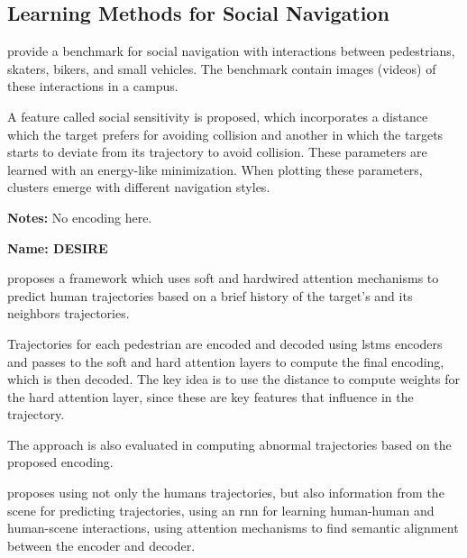 \subsection{Learning Methods for Social Navigation}\label{subsec: learning social navigation}


\cite{robicquet2016learning} provide a benchmark for social navigation with interactions between pedestrians, skaters, bikers, and small vehicles. 
%
The benchmark contain images (videos) of these interactions in a campus.

A feature called social sensitivity is proposed, which incorporates a distance which the target prefers for avoiding collision and another in which the targets starts to deviate from its trajectory to avoid collision.
%
These parameters are learned with an energy-like minimization.
%
When plotting these parameters, clusters emerge with different navigation styles.

\textbf{Notes:} No encoding here. 


\textbf{Name: DESIRE}

\cite{lee2017desire}


\cite{fernando2018soft+} proposes a framework which uses soft and hardwired attention mechanisms to predict human trajectories based on a brief history of the target's and its neighbors trajectories.

Trajectories for each pedestrian are encoded and decoded using \glspl{lstm} encoders and passes to the soft and hard attention layers to compute the final encoding, which is then decoded.
%
The key idea is to use the distance to compute weights for the hard attention layer, since these are key features that influence in the trajectory.

The approach is also evaluated in computing abnormal trajectories based on the proposed encoding.


\cite{bhujel2019pedestrian} proposes using not only the humans trajectories, but also information from the scene for predicting trajectories, using an \gls{rnn} for learning human-human and human-scene interactions, using attention mechanisms to find semantic alignment between the encoder and decoder.

